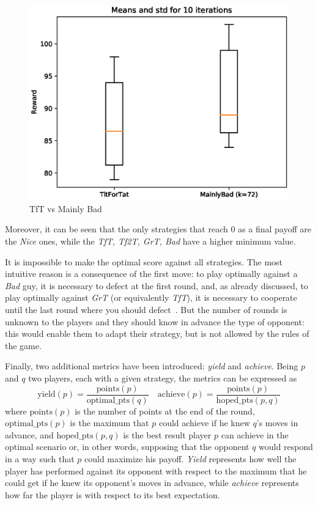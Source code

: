 \documentclass[journal,10pt,twoside]{IEEEtran}
\begin{document}
\begin{figure}[!ht]
    \centering
    \includegraphics[width=.7\columnwidth]{../img/ipd2p/ipd2p-boxplot-TitForTat-MainlyBad(k=72)}
    \caption{TfT vs Mainly Bad}
    \label{fig:boxmbvtft}
\end{figure}

Moreover, it can be seen that the only strategies that reach 0 as a final payoff are the \textit{Nice} ones, while the \textit{TfT, Tf2T, GrT, Bad} have a higher minimum value.

It is impossible to make the optimal score against all strategies. The most intuitive reason is a consequence of the first move: to play optimally against a \textit{Bad} guy, it is necessary to defect at the first round, and, as already discussed, to play optimally against \textit{GrT} (or equivalently \textit{TfT}), it is necessary to cooperate until the last round where you should defect~\cite{mathieu2017}.
But the number of rounds is unknown to the players and they should know in advance the type of opponent: this would enable them to adapt their strategy, but is not allowed by the rules of the game. 

Finally, two additional metrics have been introduced: \textit{yield} and \textit{achieve}. 
Being $p$ and $q$ two players, each with a given strategy, the metrics can be expressed as
$$
\mathrm{yield}(p) = \frac{\mathrm{points}(p)}{\mathrm{optimal\_pts}(q)} \quad
\mathrm{achieve}(p) = \frac{\mathrm{points}(p)}{\mathrm{hoped\_pts}(p,q)}
$$
where $\mathrm{points}(p)$ is the number of points at the end of the round,
$\mathrm{optimal\_pts}(p)$ is the maximum that $p$ could achieve if he knew $q$'s moves in advance, and
$\mathrm{hoped\_pts}(p,q)$ is the best result player $p$ can achieve in the optimal scenario or, in other words, supposing that the opponent $q$ would respond in a way such that $p$ could maximize his payoff.
\textit{Yield} represents how well the player has performed against its opponent with respect to the maximum that he could get if he knew its opponent's moves in advance, while \textit{achieve} represents how far the player is with respect to its best expectation.
\end{document}
